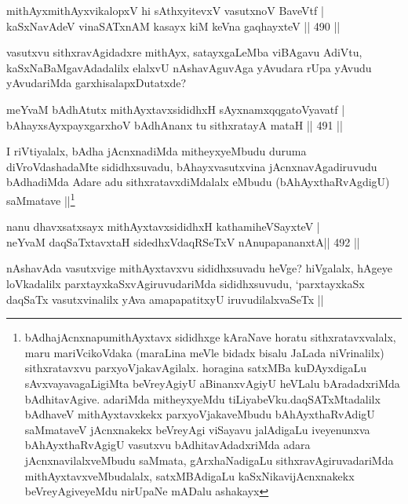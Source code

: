 \begin{shl}
mithAyxmithAyxvikalopxV hi sAthxyitevxV vasutxnoV BaveVtf | \\
kaSxNavAdeV vinaSATxnAM kasayx kiM keVna gaqhayxteV \hfill||  490 ||  
\end{shl}

\begin{artha}
vasutxvu sithxravAgidadxre mithAyx, satayxgaLeMba viBAgavu AdiVtu, kaSxNaBaMgavAdadalilx elalxvU nAshavAguvAga yAvudara rUpa yAvudu yAvudariMda garxhisalapxDutatxde?
\end{artha}


\begin{shl}
meYvaM bAdhAtutx mithAyxtavxsididhxH sAyxnamxqqgatoVyavatf | \\
bAhayxsAyxpayxgarxhoV bAdhAnanx tu sithxratayA mataH \hfill||  491 || 
\end{shl}

\begin{artha}
I riVtiyalalx, bAdha jAcnxnadiMda mitheyxyeMbudu duruma diVroVdashadaMte sididhxsuvadu, bAhayxvasutxvina jAcnxnavAgadiruvudu bAdhadiMda Adare adu sithxratavxdiMdalalx eMbudu (bAhAyxthaRvAgdigU) saMmatave ||\footnote{bAdhajAcnxnapumithAyxtavx sididhxge kAraNave horatu sithxratavxvalalx, maru mariVcikoVdaka (maraLina meVle bidadx bisalu JaLada niVrinalilx) sithxratavxvu parxyoVjakavAgilalx. horagina satxMBa kuDAyxdigaLu sAvxvayavagaLigiMta beVreyAgiyU aBinanxvAgiyU heVLalu bAradadxriMda bAdhitavAgive. adariMda mitheyxyeMdu tiLiyabeVku.daqSATxMtadalilx bAdhaveV mithAyxtavxkekx parxyoVjakaveMbudu bAhAyxthaRvAdigU saMmataveV jAcnxnakekx beVreyAgi viSayavu jalAdigaLu iveyenunxva bAhAyxthaRvAgigU vasutxvu bAdhitavAdadxriMda adara jAcnxnavilalxveMbudu saMmata, gArxhaNadigaLu sithxravAgiruvadariMda mithAyxtavxveMbudalalx, satxMBAdigaLu kaSxNikavijAcnxnakekx beVreyAgiveyeMdu nirUpaNe mADalu ashakayx} 
\end{artha}

\begin{shl}
nanu dhavxsatxsayx mithAyxtavxsididhxH kathamiheVSayxteV | \\
neYvaM daqSaTxtavxtaH sidedhxVdaqRSeTxV nAnupapananxtA\hfill ||  492 ||  
\end{shl}

\begin{artha}
nAshavAda vasutxvige mithAyxtavxvu sididhxsuvadu heVge? hiVgalalx, hAgeye loVkadalilx parxtayxkaSxvAgiruvudariMda sididhxsuvudu, `parxtayxkaSx daqSaTx vasutxvinalilx yAva amapapatitxyU iruvudilalxvaSeTx ||
\end{artha}

